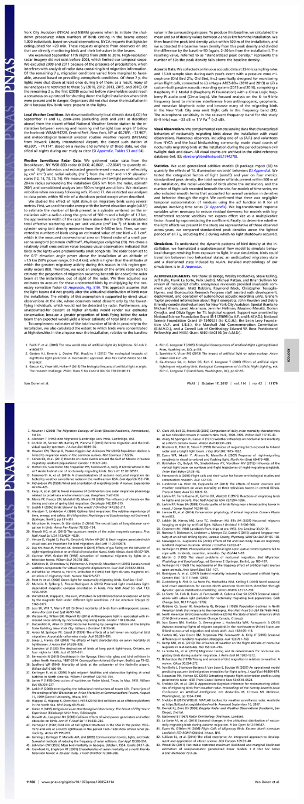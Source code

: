 \documentclass[a4paper, twoside]{templates/ociamthesis}
\begin{document}
\includegraphics[width=1\linewidth]{pdf_chapters/lights/lights_crop_Part5}
\includegraphics[width=1\linewidth]{pdf_chapters/lights/lights_crop_Part6}
\end{document}

